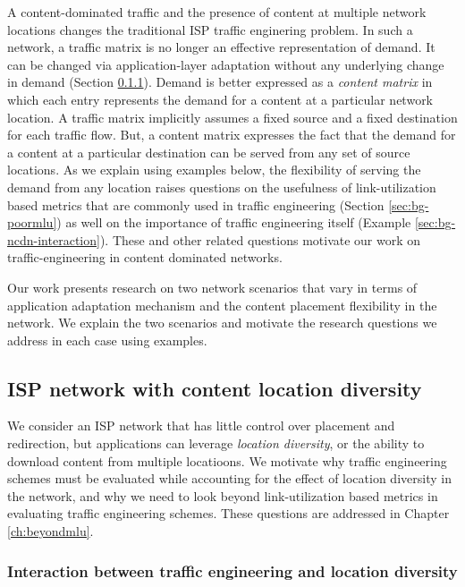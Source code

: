 A content-dominated traffic and the presence of content at multiple network locations changes the traditional ISP traffic enginering problem. In such a network, a traffic matrix is no longer an effective representation of demand. It can be changed via application-layer adaptation without any underlying change in demand (Section \ref{sec:bg-3node}). Demand is better expressed as a \emph{content matrix} in which each entry represents the demand for a content at a particular network location. A traffic matrix implicitly assumes a fixed source and a fixed destination for each traffic flow. But, a content matrix expresses the fact that the demand for a content at a particular destination can be served from any set of source locations. As we explain using examples below, the flexibility of serving the demand from any location raises questions on the usefulness of link-utilization based metrics that are commonly used in traffic engineering (Section \ref{sec:bg-poormlu}) as well on the importance of traffic engineering itself (Example \ref{sec:bg-ncdn-interaction}). These and other related questions motivate our work on traffic-engineering in content dominated networks.

Our work presents research on two network scenarios that vary in terms of application adaptation mechanism and the content placement flexibility in the network. We explain the two scenarios and motivate the research questions we address in each case using examples.

\subsection{ISP network with content location diversity}
\label{sec:bg-locdiv}
We consider an ISP network that has little control over placement and redirection, but applications can leverage \emph{location diversity}, or  the ability to download content from multiple locatioons. We motivate why traffic engineering schemes must be evaluated while accounting for the effect of location diversity in the network, and why we need to look beyond link-utilization based metrics in evaluating traffic engineering schemes. These questions are addressed in Chapter \ref{ch:beyondmlu}.

\subsubsection{Interaction between traffic engineering and location diversity}
\label{sec:bg-3node}

